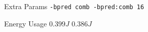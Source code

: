 
        \begin{tcolorbox}[width=\linewidth, colback=white!95!black, colframe=white!95!black]
            
            
            Extra Params \hfill \verb|-bpred comb -bpred:comb 16|

            Energy Usage \hfill \st{$0.399J$} $0.386J$

        \end{tcolorbox}
    